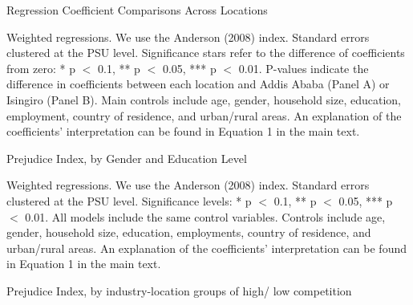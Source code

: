 \documentclass[a4paper,12pt]{article}
\renewcommand{\footnotesize}{\fontsize{8pt}{9pt}\selectfont}
\begin{document}
\begin{appendix}
\vspace{10mm}

\begin{table}[H]
	\footnotesize
	\begin{adjustwidth}{-1.5cm}{}
		\centering
		\caption{Regression Coefficient Comparisons Across Locations}    \label{tab:regression_comparisons}
		\begin{threeparttable}
	
        \begin{tablenotes}
	\footnotesize
	\item Weighted regressions. We use the Anderson (2008) index. Standard errors clustered at the PSU level. Significance stars refer to the difference of coefficients from zero: * p $<$ 0.1, ** p $<$ 0.05, *** p $<$ 0.01. P-values indicate the difference in coefficients between each location and Addis Ababa (Panel A) or Isingiro (Panel B). Main controls include age, gender, household size, education, employment, country of residence, and urban/rural areas. An explanation of the coefficients' interpretation can be found in Equation 1 in the main text.
\end{tablenotes}
\end{threeparttable}
\end{adjustwidth}
\end{table}

\begin{table}[H]
	\footnotesize
	\caption{Prejudice Index, by Gender and Education Level}
	\label{tab:het_2_pooled}
	\centering
	\begin{threeparttable}
		
\begin{tablenotes}
	\footnotesize
	\item Weighted regressions. We use the Anderson (2008) index. Standard errors clustered at the PSU level. Significance levels: * p $<$ 0.1, ** p $<$ 0.05, *** p $<$ 0.01. All models include the same control variables. Controls include age, gender, household size, education, employments, country of residence, and urban/rural areas. An explanation of the coefficients' interpretation can be found in Equation 1 in the main text. 
\end{tablenotes}
\end{threeparttable}
\end{table} 

	\setstretch{1}
\begin{table}[H]
	\footnotesize
	\caption{Prejudice Index, by industry-location groups of high/ low competition}
	\label{tab:comp_hi_lo}
	\centering
	\begin{threeparttable}
		\centering
		


\end{threeparttable}
\end{table}
\end{appendix}
\end{document}
